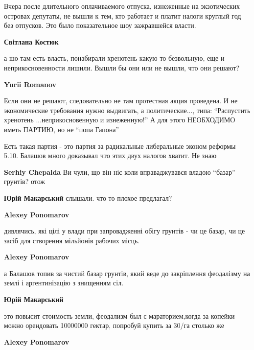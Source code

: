\begin{itemize}

Вчера после длительного оплачиваемого отпуска, изнеженные на экзотических
островах депутаты, не вышли к тем, кто работает и платит налоги круглый год без
отпусков. Это было показательное шоу зажравшейся власти.

\begin{itemize} %
\textbf{Світлана Костюк} 

а шо там есть власть, понабирали хренотень какую то безвольную, еще и
неприкосновенности лишили. Вышли бы они или не вышли, что они решают?

\textbf{Yurii Romanov} 

Если они не решают, следовательно не там протестная акция проведена. И не
экономические требования нужно выдвигать, а политические..., типа: \enquote{Распустить
хренотень ...неприкосновенную и изнеженную!} А для этого НЕОБХОДИМО иметь
ПАРТИЮ, но не \enquote{попа Гапона}

\end{itemize} %


Есть такая партия - это партия за радикальные либеральные эконом реформы 5.10.
Балашов много доказывал что этих двух налогов хватит. Не знаю

\begin{itemize} %
\textbf{Serhiy Chepalda} Ви чули, що він ніс коли вправаджувався владою \enquote{базар} грунтів? отож

\textbf{Юрій Макарський} слышали. что то плохое предлагал?

\textbf{Alexey Ponomarov} 

дивлячись, які цілі у влади при запровадженні обігу грунтів - чи це базар, чи це
засіб для створення мільйонів рабочих місць.

\textbf{Alexey Ponomarov} 

а Балашов топив за чистий базар грунтів, який веде до закріплення феодалізму на
землі і аргентинізацію з знищенням сіл.

\textbf{Юрій Макарський} 

это повысит стоимость земли, феодализм был с мараторием,когда за копейки можно
орендовать 10000000 гектар, попробуй купить за 30/га столько же

\textbf{Alexey Ponomarov} 


\end{itemize}
\end{itemize}
